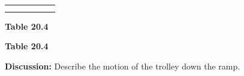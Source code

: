\begin{table}[H]
\begin{center}
\begin{xtabular}[t]{|l|l|l|l|l|l|}
         &
         &
         &
         &
         &
     \tabularnewline{}
         &
         &
         &
         &
         &
     \tabularnewline{}
    \end{xtabular}
      \end{center}
    \begin{center}{\small\bfseries Table 20.4}\end{center}
    \begin{caption}{\small\bfseries Table 20.4}\end{caption}
\end{table}
    \par
        \label{m38795*id7172254}\noindent{}\textbf{Discussion:}
Describe the motion of the trolley down the ramp. 
\par \label{m38795*cid9}
